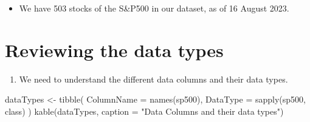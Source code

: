 \documentclass[
  letterpaper,
  DIV=11,
  numbers=noendperiod]{scrreport}
\newenvironment{Shaded}{\begin{snugshade}}{\end{snugshade}}
\newcommand{\AttributeTok}[1]{\textcolor[rgb]{0.40,0.45,0.13}{#1}}
\newcommand{\FunctionTok}[1]{\textcolor[rgb]{0.28,0.35,0.67}{#1}}
\newcommand{\NormalTok}[1]{\textcolor[rgb]{0.00,0.23,0.31}{#1}}
\newcommand{\OtherTok}[1]{\textcolor[rgb]{0.00,0.23,0.31}{#1}}
\newcommand{\StringTok}[1]{\textcolor[rgb]{0.13,0.47,0.30}{#1}}
\providecommand{\tightlist}{%
  \setlength{\itemsep}{0pt}\setlength{\parskip}{0pt}}\usepackage{longtable,booktabs,array}
\begin{document}
\begin{itemize}
\tightlist
\item
  We have 503 stocks of the S\&P500 in our dataset, as of 16 August
  2023.
\end{itemize}

\hypertarget{reviewing-the-data-types}{%
\section{Reviewing the data types}\label{reviewing-the-data-types}}

\begin{enumerate}
\def\labelenumi{\arabic{enumi}.}
\tightlist
\item
  We need to understand the different data columns and their data types.
\end{enumerate}

\begin{Shaded}
\begin{Highlighting}[]
\NormalTok{dataTypes }\OtherTok{\textless{}{-}} \FunctionTok{tibble}\NormalTok{(}
  \AttributeTok{ColumnName =} \FunctionTok{names}\NormalTok{(sp500),}
  \AttributeTok{DataType =} \FunctionTok{sapply}\NormalTok{(sp500, class)}
\NormalTok{)}
\FunctionTok{kable}\NormalTok{(dataTypes, }\AttributeTok{caption =} \StringTok{"Data Columns and their data types"}\NormalTok{) }
\end{Highlighting}
\end{Shaded}
\end{document}
